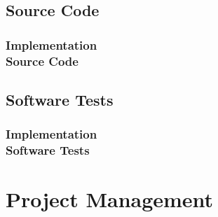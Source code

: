 \documentclass[ucs,10pt]{beamer}
\begin{document}
\subsection{Source Code}

\begin{frame}
\frametitle{Implementation \\
	\small \color{rwth-blue} Source Code}
\end{frame}

\subsection{Software Tests}

\begin{frame}
\frametitle{Implementation \\
	\small \color{rwth-blue} Software Tests}
\end{frame}



\section{Project Management}
\end{document}
